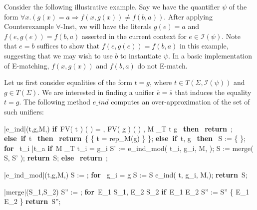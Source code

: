 \documentclass{llncs}
\def\IF{\qtab\keyword{if}\ }
\def\THEN{\ \keyword{then}\ }
\def\ELSE{\untab\qtab\keyword{else}\ }
\def\ELSEIF{\untab\qtab\keyword{else if}\ }
\def\FI{\untab}
\def\RETURN{\keyword{return}\ }
\def\ENDPROC{\untab}
\def\DOFOR{\qtab\keyword{for}\ }
\def\ENDFOR{\untab}
\def\keyword#1{\mbox{\normalshape\bf #1}}
\begin{document}
Consider the following illustrative example.
Say we have the quantifier $\psi$ of the form $\forall x. (g(x) = a \Rightarrow f( x, g( x ) ) \neq f( b, a ))$.
After applying Counterexample $\forall$-Inst, we will have the literals $g(e) = a$ and $f( e, g( e ) ) = f( b, a )$ asserted in the current context for $e \in \mathcal{I}( \psi )$.
Note that $e = b$ suffices to show that $f( e, g( e ) ) = f( b, a )$ in this example, suggesting that we may wish to use $b$ to instantiate $\psi$.
In a basic implementation of E-matching, $f( x, g( x ) )$ and $f( b, a )$ do not E-match.

Let us first consider equalities of the form $t = g$, where $t \in T( \Sigma, \mathcal{I}( \psi ) )$ and $g \in T( \Sigma )$.
We are interested in finding a unifier $\bar{e} = \bar{s}$ that induces the equality $t = g$.
The following method $e\_ind$ computes an over-approximation of the set of such unifiers:

\begin{minipage}[t]{.4\linewidth}
\begin{program}
\PROC |e\_ind|(t,g,M,\psi) \BODY
  \IF FV( t ) \cap {}( \psi ) = \emptyset, FV( g ) \cap {}( \psi ) \neq \emptyset,
       M \models_T t \neq g \THEN
    \RETURN \emptyset;
  \ELSEIF t  \THEN
    \RETURN \{ \{ t = rep_M(g) \} \};
  \ELSEIF t, g  \THEN
    S := \{ \emptyset \};
    \DOFOR {} t_i  \bar{t_a} 
      \IF M \not\models_T t_i = g_i
        S' := e\_ind\_mod( t_i, g_i, M, \psi );
        S := merge( S, S' );
      \FI
    \ENDFOR
    \RETURN S;
  \ELSE
    \RETURN \emptyset;
  \FI
\ENDPROC
\end{program}
\end{minipage}
\begin{minipage}[t]{.4\linewidth}
\begin{program}
\PROC |e\_ind\_mod|(t,g,M,\psi) \BODY
  S := \emptyset;
  \DOFOR {} g_i = g
    S := S \cup e\_ind( t, g_i, M,\psi );
  \ENDFOR
  \RETURN S;
\ENDPROC
\end{program}
\begin{program}
\PROC |merge|(S_1,S_2) \BODY
  S'' := \emptyset;
  \DOFOR E_1 \in S_1, E_2 \in S_2
    \IF E_1  E_2 
      S'' := S'' \cup \{ E_1 \cup E_2 \}
    \FI
  \ENDFOR
  \RETURN S'';
\ENDPROC
\end{program}
\end{minipage}
\end{document}
